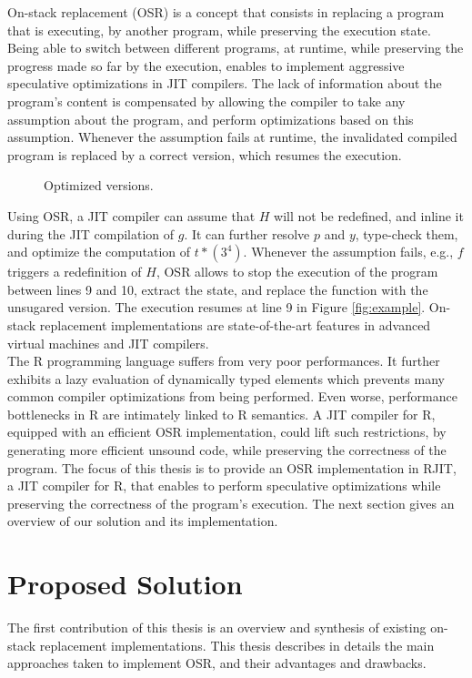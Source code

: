 On-stack replacement (OSR) is a concept that consists in replacing a program that is executing, by another program, while preserving the execution state.
Being able to switch between different programs, at runtime, while preserving the progress made so far by the execution, enables to implement aggressive speculative optimizations in JIT compilers.
The lack of information about the program's content is compensated by allowing the compiler to take any assumption about the program, and perform optimizations based on this assumption.
Whenever the assumption fails at runtime, the invalidated compiled program is replaced by a correct version, which resumes the execution.\\

\begin{wrapfigure}[13]{l}{6.5cm}
\caption{Optimized versions.}
\end{wrapfigure}
Using OSR, a JIT compiler can assume that $H$ will not be redefined, and inline it during the JIT compilation of $g$.
It can further resolve $p$ and $y$, type-check them, and optimize the computation of $t * (3 ^ 4)$.
Whenever the assumption fails, e.g., $f$ triggers a redefinition of $H$, OSR allows to stop the execution of the program between lines 9 and 10, extract the state, and replace the function with the unsugared version.
The execution resumes at line 9 in Figure \ref{fig:example}.
On-stack replacement implementations are state-of-the-art features in advanced virtual machines and JIT compilers.\\


The R programming language suffers from very poor performances\cite{morandat2012evaluating}. 
It further exhibits a lazy evaluation of dynamically typed elements which prevents many common compiler optimizations from being performed.
Even worse, performance bottlenecks in R are intimately linked to R semantics. 
A JIT compiler for R, equipped with an efficient OSR implementation, could lift such restrictions, by generating more efficient unsound code, while preserving the correctness of the program.
The focus of this thesis is to provide an OSR implementation in RJIT, a JIT compiler for R, that enables to perform speculative optimizations while preserving the correctness of the program's execution.
The next section gives an overview of our solution and its implementation.\\

\section{Proposed Solution}
The first contribution of this thesis is an overview and synthesis of existing on-stack replacement implementations.
This thesis describes in details the main approaches taken to implement OSR, and their advantages and drawbacks.\\

